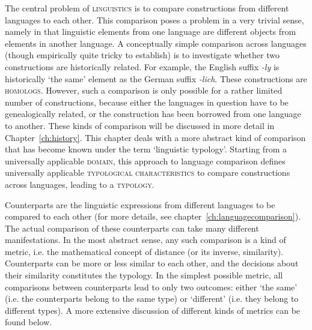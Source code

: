 \label{ch:typology}

The central problem of \textsc{linguistics} is to compare constructions from different languages to each other. This comparison poses a problem in a very trivial sense, namely in that linguistic elements from one language are different objects from elements in another language. A conceptually simple comparison across languages (though empirically quite tricky to establish) is to investigate whether two constructions are historically related. For example, the English suffix \textit{-ly} is historically `the same' element as the German suffix \textit{-lich}. These constructions are \textsc{homologs}. However, such a comparison is only possible for a rather limited number of constructions, because either the languages in question have to be genealogically related, or the construction has been borrowed from one language to another. These kinds of comparison will be discussed in more detail in Chapter~\ref{ch:history}. This chapter deals with a more abstract kind of comparison that has become known under the term `linguistic typology'. Starting from a universally applicable \textsc{domain}, this approach to language comparison defines universally applicable \textsc{typological characteristics} to compare constructions across languages, leading to a \textsc{typology}.

%
Counterparts are the linguistic expressions from different languages to be compared to each other (for more details, see chapter~\ref{ch:languagecomparison}). The actual comparison of these counterparts can take many different manifestations. In the most abstract sense, any such comparison is a kind of metric, i.e. the mathematical concept of distance (or its inverse, similarity). Counterparts can be more or less similar to each other, and the decisions about their similarity constitutes the typology. In the simplest possible metric, all comparisons between  counterparts lead to only two outcomes: either `the same' (i.e. the counterparts belong to the same type) or `different' (i.e. they belong to different types). A more extensive discussion of different kinds of metrics can be found below. 

